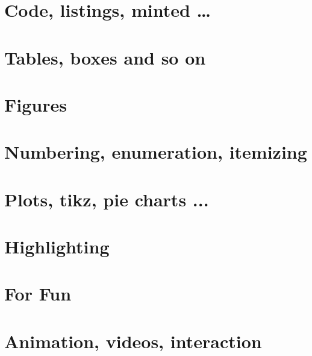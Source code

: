 \documentclass[12pt]{article}
\begin{document}
\section{Code, listings, minted \dots}


 
\clearpage
\section{Tables, boxes and so on}


\clearpage
\section{Figures}


\clearpage
\section{Numbering, enumeration, itemizing}


\clearpage
\section{Plots, tikz, pie charts ...}

\clearpage
\section{Highlighting}

 
\clearpage
\section{For Fun}


\clearpage
\section{ Animation, videos, interaction}

 
\end{document}
